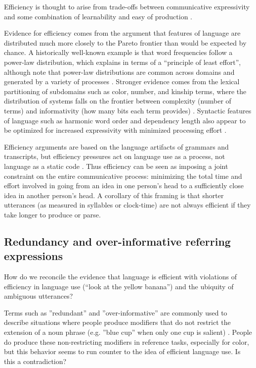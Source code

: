 \documentclass[]{article}
\begin{document}
Efficiency is thought to arise from trade-offs between communicative expressivity and some combination of learnability and easy of production \citep{piantadosi2012, kirby2015}.

Evidence for efficiency comes from the argument that features of language are distributed much more closely to the Pareto frontier than would be expected by chance. A historically well-known example is that word frequencies follow a power-law distribution, which \cite{zipf1949} explains in terms of a ``principle of least effort'', although note that power-law distributions are common across domains and generated by a variety of processes \cite{piantadosi2014}. Stronger evidence comes from the lexical partitioning of subdomains such as color, number, and kinship terms, where the distribution of systems falls on the frontier between complexity (number of terms) and informativity (how many bits each term provides) \citep{zaslavsky2018, kemp2018, gibson2019}. Syntactic features of language such as harmonic word order and dependency length also appear to be optimized for increased expressivity with minimized processing effort \citep{gibson2019, hawkins1995}. 
	
Efficiency arguments are based on the language artifacts of grammars and transcripts, but efficiency pressures act on language use as a process, not language as a static code \citep{gibson2019}. Thus efficiency can be seen as imposing a joint constraint on the entire communicative process: minimizing the total time and effort involved in going from an idea in one person's head to a sufficiently close idea in another person's head. A corollary of this framing is that shorter utterances (as measured in syllables or clock-time) are not always efficient if they take longer to produce or parse. 



\subsection{Redundancy and over-informative referring expressions}
How do we reconcile the evidence that language is efficient with violations of efficiency in language use (``look at the yellow banana'') and the ubiquity of ambiguous utterances?

Terms such as ''redundant'' and ''over-informative'' are commonly used to describe situations where people produce modifiers that do not restrict the extension of a noun phrase (e.g. ''blue cup'' when only one cup is salient) \citep{rubio-fernandez2021}. People do produce these non-restricting modifiers in reference tasks, especially for color, but this behavior seems to run counter to the idea of efficient language use. Is this a contradiction? 
\end{document}
